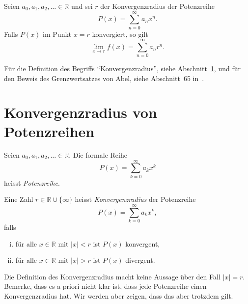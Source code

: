 \documentclass[../main.tex]{subfiles}
\begin{document}
\begin{theorem*}
  Seien $a_0, a_1, a_2, \dots \in \mathbb{R}$ und
  sei $r$ der Konvergenzradius der Potenzreihe
  \[
    P(x) = \sum_{n=0}^{\infty} a_n x^n.
  \]
  Falls $P(x)$ im Punkt $x = r$ konvergiert, so gilt
  \[
    \lim_{x \to r} f(x) = \sum_{n=0}^{\infty} a_n r^n.
  \]
\end{theorem*}

Für die Definition des Begriffs ``Konvergenzradius'',
siehe Abschnitt~\ref{sec:radius}, und
für den Beweis des Grenzwertsatzes von Abel,
siehe Abschnitt~65 in~\cite{heuser}.


\section{Konvergenzradius von Potenzreihen}\label{sec:radius}
Seien $a_0, a_1, a_2, \dots \in \mathbb{R}$.
Die formale Reihe
\[
  P(x) = \sum_{k=0}^{\infty} a_k x^k
\]
heisst \emph{Potenzreihe}.

\begin{definition}
  Eine Zahl $r \in \mathbb{R} \cup \{\infty\}$ heisst
  \emph{Konvergenzradius} der Potenzreihe 
  \[
    P(x) = \sum_{k=0}^{\infty} a_k x^k,
  \]
  falls
  \begin{enumerate}[(i)]
    \item für alle $x \in \mathbb{R}$ mit $|x| < r$ ist $P(x)$ konvergent,
    \item für alle $x \in \mathbb{R}$ mit $|x| > r$ ist $P(x)$ divergent.
  \end{enumerate}
\end{definition}

Die Definition des Konvergenzradius macht keine Aussage über den Fall $|x| = r$.
Bemerke, dass es a priori nicht klar ist, dass jede Potenzreihe
einen Konvergenzradius hat. Wir werden aber zeigen, dass das aber trotzdem gilt.
\end{document}
